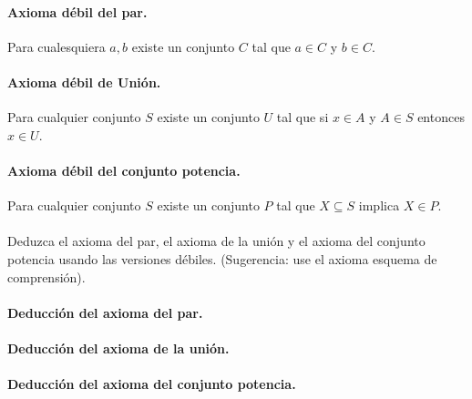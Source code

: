 \documentclass{article}
\begin{document}
\paragraph{Axioma débil del par.} Para cualesquiera $a, b$ existe un conjunto $C$ tal que $a \in C$ y $b \in C$.
\paragraph{Axioma débil de Unión.} Para cualquier conjunto $S$ existe un conjunto $U$ tal que si $x \in A$ y $A \in S$ entonces $x \in U$.
\paragraph{Axioma débil del conjunto potencia.} Para cualquier conjunto $S$ existe un conjunto $P$ tal que $X \subseteq S$ implica $X \in P$.
\paragraph{} Deduzca el axioma del par, el axioma de la unión y el axioma del conjunto potencia usando las versiones débiles. (Sugerencia: use el axioma esquema de comprensión).
\paragraph{Deducción del axioma del par.}
\paragraph{Deducción del axioma de la unión.}
\paragraph{Deducción del axioma del conjunto potencia.}
\end{document}

